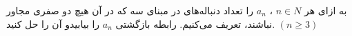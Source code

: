\EXERCISE
به ازای هر
$n \in N$
،
$a_n$
را تعداد دنباله‌های در مبنای سه که در آن هیچ دو صفری مجاور نباشند، تعریف می‌کنیم. رابطه بازگشتی
$a_n$
را بیابیدو آن را حل کنید.
$(n \geq 3)$